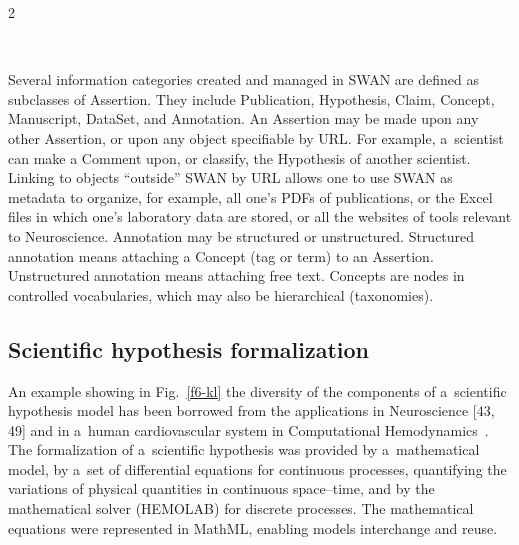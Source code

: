 \begin{multicols}{2}
  \begin{figure*}[b] %
  \vspace*{1pt}
 \begin{center}
 \mbox{%
 \epsfxsize=160.208mm
 }
 \end{center}
 \vspace*{-9pt}
  \label{f6-kl}
  \end{figure*}

  Several information categories created and managed in SWAN are defined as
subclasses of Assertion. They include Publication, Hypothesis, Claim, Concept,
Manuscript, DataSet, and Annotation. An Assertion may be made upon any other
Assertion, or upon any object specifiable by URL. For example, a~scientist can make
a Comment upon, or classify, the Hypothesis of another scientist. Linking to objects
``outside'' SWAN  by URL allows one to use SWAN as metadata to organize, for
example, all one's PDFs of publications, or the Excel files in which one's
laboratory data are stored, or all the websites of tools  relevant to Neuroscience.
Annotation may be structured or unstructured. Structured annotation means attaching
a Concept (tag or term) to an Assertion. Unstructured annotation means attaching free
text. Concepts are nodes in controlled vocabularies, which may also be hierarchical
(taxonomies).

\subsection{Scientific hypothesis formalization}

  \noindent
  An example showing in Fig.~\ref{f6-kl} the diversity of the components of a~scientific hypothesis model has been borrowed from the applications in Neuroscience
[43, 49] and in a~human cardiovascular system in Computational
Hemodynamics~\cite{11-kl, 50-kl}. The formalization of a~scientific hypothesis was
provided by a~mathematical model, by a~set of differential equations for continuous
processes, quantifying the variations of physical quantities in continuous space--time,
and by the mathematical solver (HEMOLAB) for discrete processes. The
mathematical equations were represented in MathML, enabling models interchange
and reuse.


\end{multicols}
